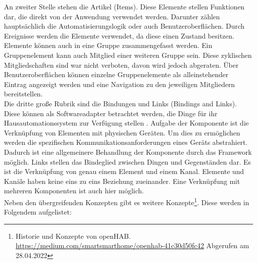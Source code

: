    An zweiter Stelle stehen die Artikel (Items). Diese Elemente stellen Funktionen dar, die direkt von der Anwendung verwendet 
    werden. Darunter zählen hauptsächlich die Automatisierungslogik oder auch Benutzeroberflächen. Durch Ereignisse werden die 
    Elemente verwendet, da diese einen Zustand besitzen. 
    \\
    Elemente können auch in eine Gruppe zusammengefasst werden. Ein Gruppenelement kann auch Mitglied einer weiteren Gruppe sein. 
    Diese zyklischen Mitgliedschaften sind war nicht verboten, davon wird jedoch abgeraten. Über Benutzeroberflächen können 
    einzelne Gruppenelemente als alleinstehender Eintrag angezeigt werden und eine Navigation zu den jeweiligen Mitgliedern 
    bereitstellen. 
    \\
    \linebreak
    Die dritte große Rubrik sind die Bindungen und Links (Bindings and Links). Diese können als Softwareadapter betrachtet werden, 
    die Dinge für ihr Hausautomationssystem zur Verfügung stellen \cite{openHAB-article}. Aufgabe der Komponente ist die Verknüpfung 
    von Elementen mit physischen Geräten. Um dies zu ermöglichen werden die spezifischen Kommunikationsanforderungen eines Geräts 
    abstrahiert. Dadurch ist eine allgemeinere Behandlung der Komponente durch das Framework möglich. Links stellen das Bindeglied 
    zwischen Dingen und Gegenständen dar. Es ist die Verknüpfung von genau einem Element und einem Kanal. Elemente und 
    Kanäle haben keine eins zu eins Beziehung zueinander. Eine Verknüpfung mit mehreren Komponenten ist auch hier möglich. 
    \\
    \linebreak
    Neben den übergreifenden Konzepten gibt es weitere Konzepte\footnote{Historie und Konzepte von openHAB. \url{https://medium.com/smartsmarthome/openhab-41c30d50fc42} Abgerufen am 28.04.2022}. 
    Diese werden in Folgendem aufgelistet:
